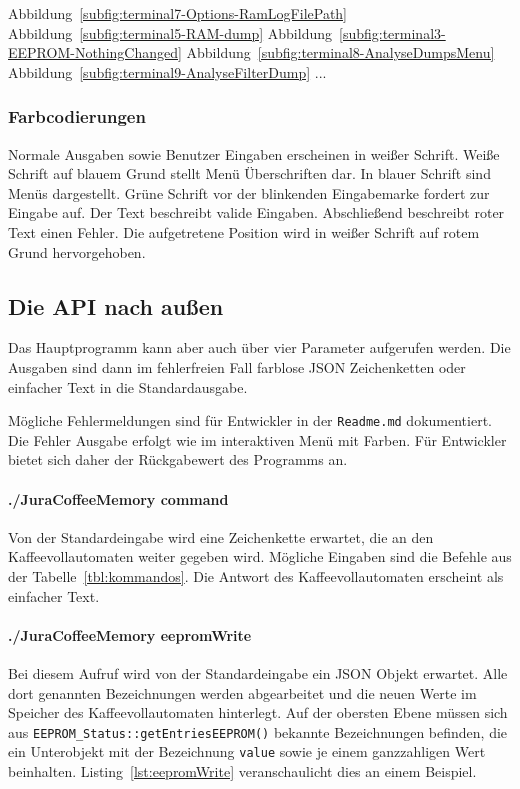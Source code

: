 \todo
Abbildung~\ref{subfig:terminal7-Options-RamLogFilePath}
Abbildung~\ref{subfig:terminal5-RAM-dump}
Abbildung~\ref{subfig:terminal3-EEPROM-NothingChanged}
Abbildung~\ref{subfig:terminal8-AnalyseDumpsMenu}
Abbildung~\ref{subfig:terminal9-AnalyseFilterDump}
\todo ...

\subsubsection{Farbcodierungen}
Normale Ausgaben sowie Benutzer Eingaben erscheinen in weißer Schrift.
Weiße Schrift auf blauem Grund stellt Menü Überschriften dar.
In blauer Schrift sind Menüs dargestellt.
Grüne Schrift vor der blinkenden Eingabemarke fordert zur Eingabe auf.
Der Text beschreibt valide Eingaben.
Abschließend beschreibt roter Text einen Fehler.
Die aufgetretene Position wird in weißer Schrift auf rotem Grund hervorgehoben.

\subsection{Die API nach außen}
Das Hauptprogramm kann aber auch über vier Parameter aufgerufen werden. Die Ausgaben sind dann im fehlerfreien Fall farblose \ac{JSON} Zeichenketten oder einfacher Text in die Standardausgabe.

Mögliche Fehlermeldungen sind für Entwickler in der \texttt{Readme.md} dokumentiert.
Die Fehler Ausgabe erfolgt wie im interaktiven Menü mit Farben.
Für Entwickler bietet sich daher der Rückgabewert des Programms an.

\paragraph{./JuraCoffeeMemory command}
Von der Standardeingabe wird eine Zeichenkette erwartet, die an den Kaffeevollautomaten weiter gegeben wird.
Mögliche Eingaben sind die Befehle aus der Tabelle~\ref{tbl:kommandos}.
Die Antwort des Kaffeevollautomaten erscheint als einfacher Text.

\paragraph{./JuraCoffeeMemory eepromWrite}
Bei diesem Aufruf wird von der Standardeingabe ein \ac{JSON} Objekt erwartet.
Alle dort genannten Bezeichnungen werden abgearbeitet und die neuen Werte im Speicher des Kaffeevollautomaten hinterlegt.
Auf der obersten Ebene müssen sich aus \texttt{EEPROM\_Status::getEntriesEEPROM()} bekannte Bezeichnungen befinden, die ein Unterobjekt mit der Bezeichnung \texttt{value} sowie je einem ganzzahligen Wert beinhalten.
Listing~\ref{lst:eepromWrite} veranschaulicht dies an einem Beispiel.

